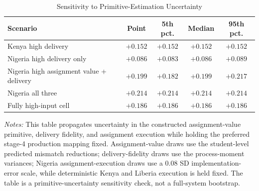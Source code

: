 \begin{table}[H]
\centering
\caption{Sensitivity to Primitive-Estimation Uncertainty}
\label{tab:struct_primitive_uncertainty}
\begin{threeparttable}
\begin{tabular}[t]{lcccc}
\toprule
Scenario & Point & 5th pct. & Median & 95th pct. \\
\midrule
Kenya high delivery & $+0.152$ & $+0.152$ & $+0.152$ & $+0.152$ \\
Nigeria high delivery only & $+0.086$ & $+0.083$ & $+0.086$ & $+0.089$ \\
Nigeria high assignment value + delivery & $+0.199$ & $+0.182$ & $+0.199$ & $+0.217$ \\
Nigeria all three & $+0.214$ & $+0.214$ & $+0.214$ & $+0.214$ \\
Fully high-input cell & $+0.186$ & $+0.186$ & $+0.186$ & $+0.186$ \\
\bottomrule
\end{tabular}
\begin{tablenotes}
\footnotesize
\item \textit{Notes:} This table propagates uncertainty in the constructed assignment-value primitive, delivery fidelity, and assignment execution while holding the preferred stage-4 production mapping fixed. Assignment-value draws use the student-level predicted mismatch reductions; delivery-fidelity draws use the process-moment variances; Nigeria assignment-execution draws use a 0.08 SD implementation-error scale, while deterministic Kenya and Liberia execution is held fixed. The table is a primitive-uncertainty sensitivity check, not a full-system bootstrap.
\end{tablenotes}
\end{threeparttable}
\end{table}

